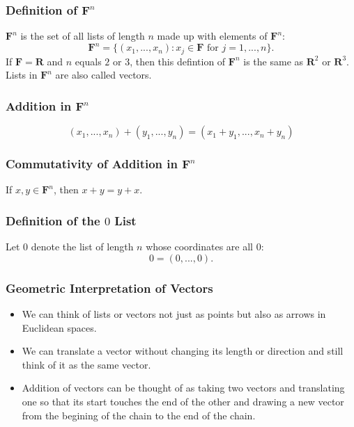 \documentclass{article}
\begin{document}
	\subsubsection{Definition of $\mathbf{F}^n$}
	$\mathbf{F}^n$ is the set of all lists of length $n$ made up with elements of $\mathbf{F}^n$:
	\begin{equation*}
		\mathbf{F}^n = \{ \left( x_1, ..., x_n \right) : x_j \in \mathbf{F} \text{ for } j=1,...,n \}.
	\end{equation*}
	If $\mathbf{F} = \mathbf{R}$ and $n$ equals $2$ or $3$, then this defintion of $\mathbf{F}^n$ is the same as $\mathbf{R}^2$ or $\mathbf{R}^3$. Lists in $\mathbf{F}^n$ are also called vectors.

	\subsubsection{Addition in $\mathbf{F}^n$}
	\begin{equation*}
		(x_1, ..., x_n) + (y_1, ..., y_n) = (x_1 + y_1, ..., x_n + y_n)
	\end{equation*} 

	\subsubsection{Commutativity of Addition in $\mathbf{F}^n$}
	If $x,y\in\mathbf{F}^n$, then $x + y = y + x$.

	\subsubsection{Definition of the $0$ List}
	Let $0$ denote the list of length $n$ whose coordinates are all $0$:
	\begin{equation*}
		0 = (0, ..., 0).
	\end{equation*}

	\subsubsection{Geometric Interpretation of Vectors}
	\begin{itemize}
		\item We can think of lists or vectors not just as points but also as arrows in Euclidean spaces.
		\item We can translate a vector without changing its length or direction and still think of it as the same vector.
		\item Addition of vectors can be thought of as taking two vectors and translating one so that its start touches the end of the other and drawing a new vector from the begining of the chain to the end of the chain.
	\end{itemize}
\end{document}
